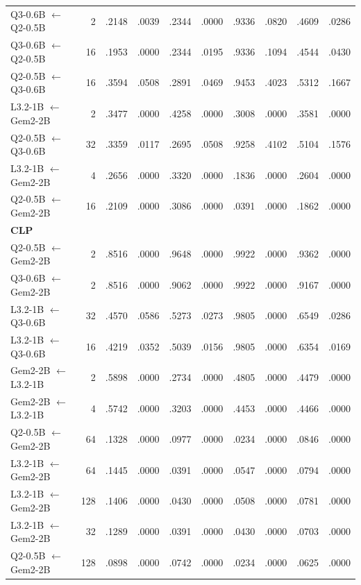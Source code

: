 \begin{longtable}{p{}rrrrrrrrr}
Q3-0.6B $\leftarrow$ Q2-0.5B & 2 & .2148 & .0039 & .2344 & .0000 & .9336 & .0820 & .4609 & .0286 \\
Q3-0.6B $\leftarrow$ Q2-0.5B & 16 & .1953 & .0000 & .2344 & .0195 & .9336 & .1094 & .4544 & .0430 \\
Q2-0.5B $\leftarrow$ Q3-0.6B & 16 & .3594 & .0508 & .2891 & .0469 & .9453 & .4023 & .5312 & .1667 \\
L3.2-1B $\leftarrow$ Gem2-2B & 2 & .3477 & .0000 & .4258 & .0000 & .3008 & .0000 & .3581 & .0000 \\
Q2-0.5B $\leftarrow$ Q3-0.6B & 32 & .3359 & .0117 & .2695 & .0508 & .9258 & .4102 & .5104 & .1576 \\
L3.2-1B $\leftarrow$ Gem2-2B & 4 & .2656 & .0000 & .3320 & .0000 & .1836 & .0000 & .2604 & .0000 \\
Q2-0.5B $\leftarrow$ Gem2-2B & 16 & .2109 & .0000 & .3086 & .0000 & .0391 & .0000 & .1862 & .0000 \\
\midrule
\multicolumn{10}{l}{\textbf{CLP}} \\
\addlinespace[2pt]
Q2-0.5B $\leftarrow$ Gem2-2B & 2 & .8516 & .0000 & .9648 & .0000 & .9922 & .0000 & .9362 & .0000 \\
Q3-0.6B $\leftarrow$ Gem2-2B & 2 & .8516 & .0000 & .9062 & .0000 & .9922 & .0000 & .9167 & .0000 \\
L3.2-1B $\leftarrow$ Q3-0.6B & 32 & .4570 & .0586 & .5273 & .0273 & .9805 & .0000 & .6549 & .0286 \\
L3.2-1B $\leftarrow$ Q3-0.6B & 16 & .4219 & .0352 & .5039 & .0156 & .9805 & .0000 & .6354 & .0169 \\
Gem2-2B $\leftarrow$ L3.2-1B & 2 & .5898 & .0000 & .2734 & .0000 & .4805 & .0000 & .4479 & .0000 \\
Gem2-2B $\leftarrow$ L3.2-1B & 4 & .5742 & .0000 & .3203 & .0000 & .4453 & .0000 & .4466 & .0000 \\
Q2-0.5B $\leftarrow$ Gem2-2B & 64 & .1328 & .0000 & .0977 & .0000 & .0234 & .0000 & .0846 & .0000 \\
L3.2-1B $\leftarrow$ Gem2-2B & 64 & .1445 & .0000 & .0391 & .0000 & .0547 & .0000 & .0794 & .0000 \\
L3.2-1B $\leftarrow$ Gem2-2B & 128 & .1406 & .0000 & .0430 & .0000 & .0508 & .0000 & .0781 & .0000 \\
L3.2-1B $\leftarrow$ Gem2-2B & 32 & .1289 & .0000 & .0391 & .0000 & .0430 & .0000 & .0703 & .0000 \\
Q2-0.5B $\leftarrow$ Gem2-2B & 128 & .0898 & .0000 & .0742 & .0000 & .0234 & .0000 & .0625 & .0000 \\

\end{longtable}
